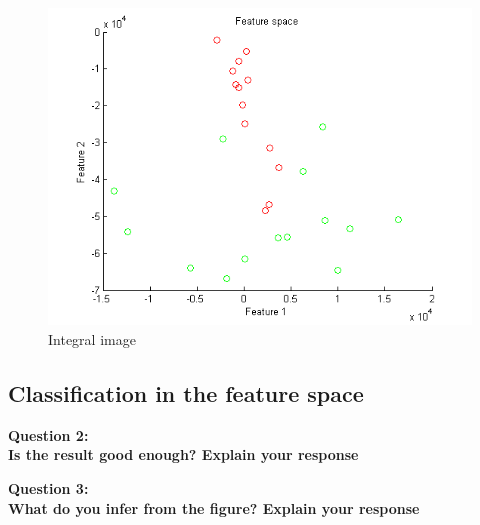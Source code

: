 \begin{figure}[htb]
	\centering
		\includegraphics[width=\textwidth]{./img/ex1/featscatter.png}
	\caption{Integral image}
	\label{fig:integralim}
\end{figure}

\subsection{Classification in the feature space}

{\bfseries Question 2: \\Is the result good enough? Explain your response}

{\bfseries Question 3: \\What do you infer from the figure? Explain your response}